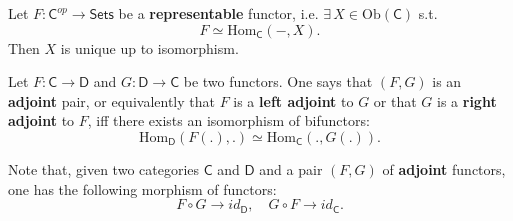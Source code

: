 \begin{prop}
	Let $F: \mathsf{C}^{op} \to \mathsf{Sets}$ be a \textbf{representable} functor, i.e. $\exists\, X \in \mathrm{Ob} \left(\mathsf{C}\right)$ s.t.
	\begin{equation}
	F \simeq \mathrm{Hom}_{\mathsf{C}} \left( -, X \right)
	.\end{equation} 
	Then $X$ is unique up to isomorphism.
\end{prop} 

\begin{defn}
	Let $F: \mathsf{C} \to \mathsf{D}$ and $G: \mathsf{D} \to \mathsf{C}$ be two functors.
	One says that $\left(F, G\right)$ is an \textbf{adjoint} pair, or equivalently that $F$ is a \textbf{left adjoint} to $G$ or that $G$ is a \textbf{right adjoint} to $F$,
	iff there exists an isomorphism of bifunctors:
	\begin{equation}
		\mathrm{Hom}_{\mathsf{D}} \left( F(.), . \right) \simeq \mathrm{Hom}_{\mathsf{C}} \left( ., G(.) \right)
	.\end{equation} 
\end{defn}

\begin{rem}
	Note that, given two categories $\mathsf{C}$ and $\mathsf{D}$ and a pair $\left(F, G\right)$ of \textbf{adjoint} functors, one has the following morphism of functors:
	\begin{equation}
	F \circ G \to id_\mathsf{D}, \quad G \circ F \to id_\mathsf{C}
	.\end{equation} 
\end{rem}


